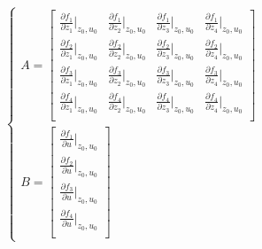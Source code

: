 \documentclass[a4paper,12pt]{article}
\begin{document}
    \begin{equation}
        \begin{cases}
            A=
            \begin{bmatrix}
                \frac
                {\partial f_1}
                {\partial z_1}|_{z_0,u_0} &
                \frac
                {\partial f_1}
                {\partial z_2}|_{z_0,u_0} &
                \frac
                {\partial f_1}
                {\partial z_3}|_{z_0,u_0} &
                \frac
                {\partial f_1}
                {\partial z_4}|_{z_0,u_0} \\
                \frac
                {\partial f_2}
                {\partial z_1}|_{z_0,u_0} &
                \frac
                {\partial f_2}
                {\partial z_2}|_{z_0,u_0} &
                \frac
                {\partial f_2}
                {\partial z_3}|_{z_0,u_0} &
                \frac
                {\partial f_2}
                {\partial z_4}|_{z_0,u_0} \\
                \frac
                {\partial f_3}
                {\partial z_1}|_{z_0,u_0} &
                \frac
                {\partial f_3}
                {\partial z_2}|_{z_0,u_0} &
                \frac
                {\partial f_3}
                {\partial z_3}|_{z_0,u_0} &
                \frac
                {\partial f_3}
                {\partial z_4}|_{z_0,u_0} \\
                \frac
                {\partial f_4}
                {\partial z_1}|_{z_0,u_0} &
                \frac
                {\partial f_4}
                {\partial z_2}|_{z_0,u_0} &
                \frac
                {\partial f_4}
                {\partial z_3}|_{z_0,u_0} &
                \frac
                {\partial f_4}
                {\partial z_4}|_{z_0,u_0} \\
            \end{bmatrix}\\
            B=
            \begin{bmatrix}
                \frac
                {\partial f_1}
                {\partial u}|_{z_0,u_0} \\
                \frac
                {\partial f_2}
                {\partial u}|_{z_0,u_0} \\
                \frac
                {\partial f_3}
                {\partial u}|_{z_0,u_0} \\
                \frac
                {\partial f_4}
                {\partial u}|_{z_0,u_0} \\
            \end{bmatrix}
        \end{cases}
    \end{equation}
\end{document}
